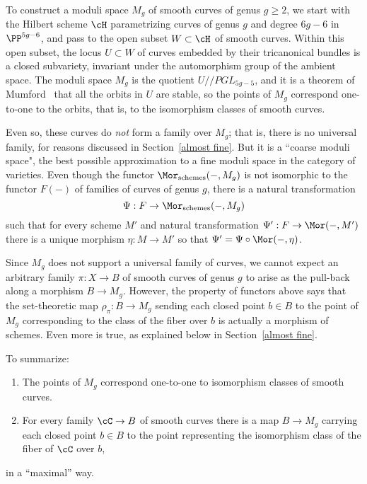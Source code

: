 To construct a moduli space $M_g$ of smooth  curves of genus $g\geq 2$, we start with the Hilbert scheme $\cH$ parametrizing curves of genus $g$ and degree $6g-6$ in $\PP^{5g-6}$, and pass to the open subset $W \subset \cH$ of smooth curves. Within this open subset, the locus $U \subset W$ of curves embedded by their tricanonical bundles is a closed subvariety, invariant under the automorphism group of the ambient space. The moduli space $M_g$ is the quotient $U//PGL_{5g-5}$, and it is a theorem of Mumford~\cite{GIT} that all the orbits in $U$ are stable, so the
points of $M_g$ correspond one-to-one to the orbits, that is, to the isomorphism classes of smooth curves. 


Even so, these curves do \emph{not} form a family over $M_g$; that is, there is no universal family, for reasons discussed in Section~\ref{almost fine}. But it is a ``coarse moduli space", the best possible approximation to a fine moduli space in the category of varieties. Even though the
functor $\Mor_{\rm schemes}(-, M_g)$ is not isomorphic to the functor $F(-)$ of families of curves of genus $g$, there is
a natural transformation
$$
\Psi: F\to \Mor_{\rm schemes}(-, M_g)
$$
such that 
for every scheme $M'$ and natural transformation $\Psi': F \to \Mor(-, M')$
there is a unique morphism $\eta: M\to M'$ so that $\Psi' = \Psi\circ \Mor(-, \eta)$.

Since $M_g$ does not support a universal family of curves, we cannot expect an arbitrary family $\pi: X \to B$ of smooth curves of genus $g$ to arise as the pull-back along a morphism $B\to M_g$. However, the property of functors above
says that the set-theoretic
map $\rho_\pi: B \to M_g$ sending each closed point  $b\in B$ to the point of $M_g$ corresponding to the class of the fiber
over $b$ is actually a morphism of schemes.  Even more is true, as explained below in Section~\ref{almost fine}. 


To summarize:
\begin{enumerate}
  \item The points of $M_g$ correspond one-to-one to isomorphism classes of smooth curves.
 \item For every family $\cC \to B$ of smooth curves there is a map $B\to M_g$ carrying
 each closed point  $b \in B$ to the point representing the isomorphism class of the fiber of $\cC$ over $b$,
 \end{enumerate}
in a ``maximal'' way.


